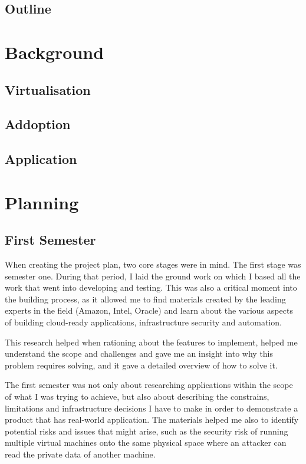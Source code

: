 \documentclass{article}
\begin{document}
\subsection{Outline}

\newpage
\section{Background}
\subsection{Virtualisation}
\subsection{Addoption}
\subsection{Application}
\newpage
\section{Planning}
\subsection{First Semester}
When creating the project plan, two core stages were in mind. The first stage was semester one. During that period, I laid the ground work on which I based all the work that went into developing and testing. This was also a critical moment into the building process, as it allowed me to find materials created by the leading experts in the field (Amazon, Intel, Oracle) and learn about the various aspects of building cloud-ready applications, infrastructure security and automation.

This research helped when rationing about the features to implement, helped me understand the scope and challenges and gave me an insight into why this problem requires solving, and it gave a detailed overview of how to solve it.

The first semester was not only about researching applications within the scope of what I was trying to achieve, but also about describing the constrains, limitations and infrastructure decisions I have to make in order to demonstrate a  product that has real-world application.
The materials helped me also to identify potential risks and issues that might arise, such as the security risk of running multiple virtual machines onto the same physical space where an attacker can read the private data of another machine.
\end{document}

